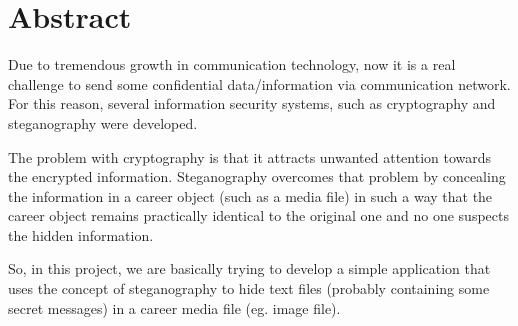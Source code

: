 \section*{Abstract}

Due to tremendous growth in communication technology, now it is a real
challenge to send some confidential data/information via communication
network. For this reason, several information security systems, such as
cryptography and steganography were developed.

The problem with cryptography is that it attracts unwanted attention
towards the encrypted information. Steganography overcomes that problem
by concealing the information in a career object (such as a media file)
in such a way that the career object remains practically identical to
the original one and no one suspects the hidden information.

So, in this project, we are basically trying to develop a simple
application that uses the concept of steganography to hide text files
(probably containing some secret messages) in a career media file
(eg. image file).
